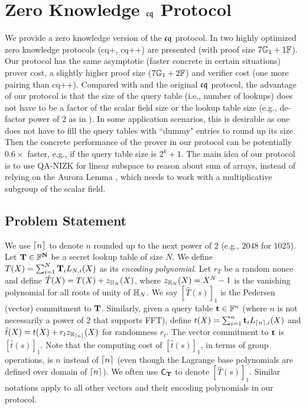 \section{Zero Knowledge ${\mathfrak{cq}}$ Protocol}
\label{apdx:zk_cq}
We provide a zero knowledge version of the
${\mathfrak{cq}}$ \cite{cq} protocol. In \cite{MatrixLookup}
two highly optimized zero knowledge protocols (cq+, cq++) 
are presented (with proof size $7 {\mathbb{G}}_1 + 1 \mathbb{F}$).
Our protocol has the same asymptotic (faster concrete in certain
situations) prover cost,
a slightly higher proof size ($7{\mathbb{G}}_1 + 2\mathbb{F}$)
and verifier cost (one more pairing than cq++).
Compared with \cite{MatrixLookup} and the original ${\mathfrak{cq}}$ protocol,
the advantage of our protocol is that the size of the query table (i.e., number
of lookups) does not have to be a factor of the scalar field size or the
lookup table size (e.g., de-factor power of $2$ as in \cite{MatrixLookup}). 
In some application scenarios, this is desirable as one does not have
to fill the query tables with ``dummy" entries to round up its size.
Then the concrete performance of the prover in our protocol can be
potentially $0.6\times$ faster, e.g., if the query table size is $2^k + 1$.
The main idea of our protocol is to use QA-NIZK for linear subspace
\cite{KW15,LegoSnarkFull}
to reason about sum of arrays, instead of relying on the Aurora Lemma \cite{aurora19},
which needs to work with a multiplicative subgroup of the scalar field.

\subsection{Problem Statement}
We use ${\lceil{n}\rceil}$ to denote $n$ rounded up to the next
power of $2$ (e.g., $2048$ for $1025$).
Let ${{\mathbf {T \in \mathbb{F}^N}}}$ be a secret lookup table of size $N$.
We define $T(X) = \sum_{i=1}^N {{\mathbf {T}}}_i L_{N,i}(X)$ as its {\em encoding polynomial}.
Let $r_T$ be a random nonce and define $\hat{T}(X) = T(X) + z_{\mathbb{H}_{N}}(X)$, where
$z_{\mathbb{H}_{N}}(X) = X^N-1$ is the vanishing polynomial for all roots of unity of ${\mathbb{H}_{N}}$.
We say $[\hat{T}(s)]_1$ is the Pedersen (vector) commitment to ${{\mathbf {T}}}$.
Similarly, given a query table ${{\mathbf {t}}} \in \mathbb{F}^n$ (where $n$ is not necessarily
a power of $2$ that supports FFT), define
$t(X) = \sum_{i=1}^n {{\mathbf {t}}}_i L_{{\lceil{n}\rceil},i}(X)$ and
$\hat{t}(X) = t(X) + r_t z_{\mathbb{H}_{{\lceil{n}\rceil}}}(X)$ for randomness $r_t$.
The vector commitment to ${{\mathbf {t}}}$ is $[\hat{t}(s)]_1$.
Note that the computing cost of $[\hat{t}(s)]_1$,
in terms of group operations, is $n$ instead of ${\lceil{n}\rceil}$ (even though
the Lagrange base polynomials are defined over domain of ${\lceil{n}\rceil}$).
We often use ${\mathsf{C}}_{{{\mathbf {T}}}}$ to denote $[\hat{T}(s)]_1$.
Similar notations apply to all other vectors and their encoding polynomials
in our protocol.

